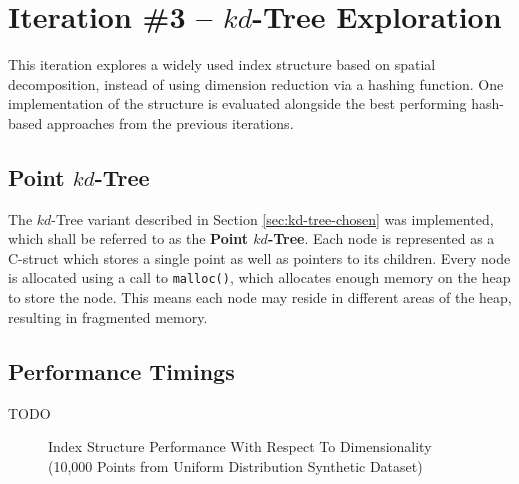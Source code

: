 \section{Iteration \#3 -- $kd$-Tree Exploration}

This iteration explores a widely used index structure based on spatial decomposition, instead of using dimension reduction via a hashing function. One implementation of the structure is evaluated alongside the best performing hash-based approaches from the previous iterations.

\subsection{Point $kd$-Tree}

The $kd$-Tree variant described in Section \ref{sec:kd-tree-chosen} was implemented, which shall be referred to as the \textbf{Point $kd$-Tree}. Each node is represented as a C-struct which stores a single point as well as pointers to its children. Every node is allocated using a call to \texttt{malloc()}, which allocates enough memory on the heap to store the node. This means each node may reside in different areas of the heap, resulting in fragmented memory.

\subsection{Performance Timings}

TODO

\begin{figure}

	\caption{Index Structure Performance With Respect To Dimensionality (10,000 Points from Uniform Distribution Synthetic Dataset)}
	\label{fig:perf3-dimensionality}
\end{figure}

